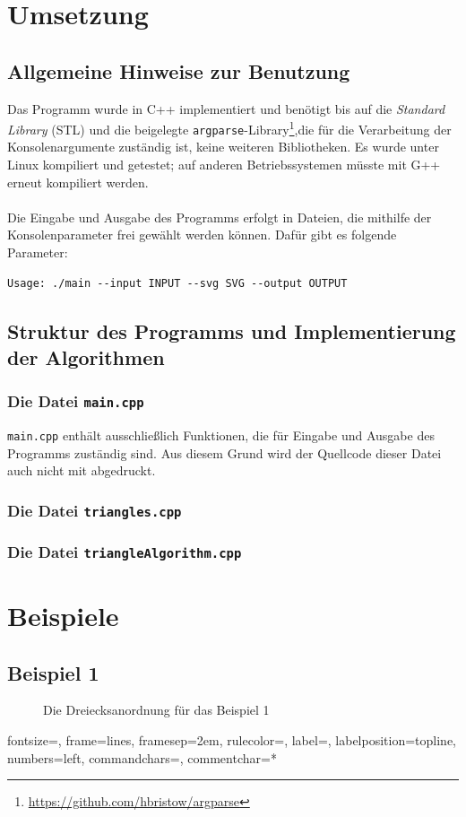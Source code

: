 \documentclass[a4paper, notitlepage, 12pt]{scrartcl}
\begin{document}
\section{Umsetzung}
\subsection{Allgemeine Hinweise zur Benutzung}
Das Programm wurde in C++ implementiert und benötigt bis auf die \textit{Standard Library} (STL) und die beigelegte \texttt{argparse}-Library\footnote{\url{https://github.com/hbristow/argparse}},die für die Verarbeitung der Konsolenargumente zuständig ist, keine weiteren Bibliotheken. Es wurde unter Linux kompiliert und getestet; auf anderen Betriebssystemen müsste mit G++ erneut kompiliert werden. \\ \\
Die Eingabe und Ausgabe des Programms erfolgt in Dateien, die mithilfe der Konsolenparameter frei gewählt werden können. Dafür gibt es folgende Parameter:
\begin{verbatim}
Usage: ./main --input INPUT --svg SVG --output OUTPUT
\end{verbatim}
\subsection{Struktur des Programms und Implementierung der Algorithmen}
\subsubsection{Die Datei \texttt{main.cpp}}
\texttt{main.cpp} enthält ausschließlich Funktionen, die für Eingabe und Ausgabe des Programms zuständig sind. Aus diesem Grund wird der Quellcode dieser Datei auch nicht mit abgedruckt.
\subsubsection{Die Datei \texttt{triangles.cpp}}
\subsubsection{Die Datei \texttt{triangleAlgorithm.cpp}}
\section{Beispiele}
\subsection{Beispiel 1}
\begin{figure}[H] 
	
	\caption{Die Dreiecksanordnung für das Beispiel 1}
\end{figure}
%
{fontsize=\footnotesize,
	frame=lines,  %
	framesep=2em, %
	rulecolor=\color{Gray},
	label=,
	labelposition=topline,
	numbers=left,
	commandchars=\|\(\), %
	commentchar=*        %
}
\end{document}

